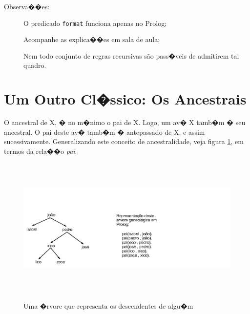 \documentclass[final,a4paper]{article}
\begin{document}
\newpage
Observa��es:

\begin{description}

\item [] O predicado \texttt{format} funciona apenas no Prolog;

\item [] Acompanhe as explica��es em sala de aula;


\item []   Nem todo conjunto de regras recursivas s\~{a}o pass�veis de
admitirem tal quadro.

\end{description}




\section{Um Outro Cl�ssico: Os Ancestrais}

 O  ancestral de X, � no m�nimo o pai de X. Logo,
um av� X tamb�m � seu ancestral. O pai deste av� tamb�m �
 antepassado de X, e assim sucessivamente.  Generalizando este conceito de
ancestralidade, veja figura \ref{fig_ancestral}, em termos da rela��o {\em pai}.

\begin{figure}[!htb]
\centering
\includegraphics[height=7cm, width=12cm]{figuras/ancestral.pdf}
\label{fig_ancestral}
\caption{Uma �rvore que representa os descendentes de algu�m}
\end{figure}
\end{document}
